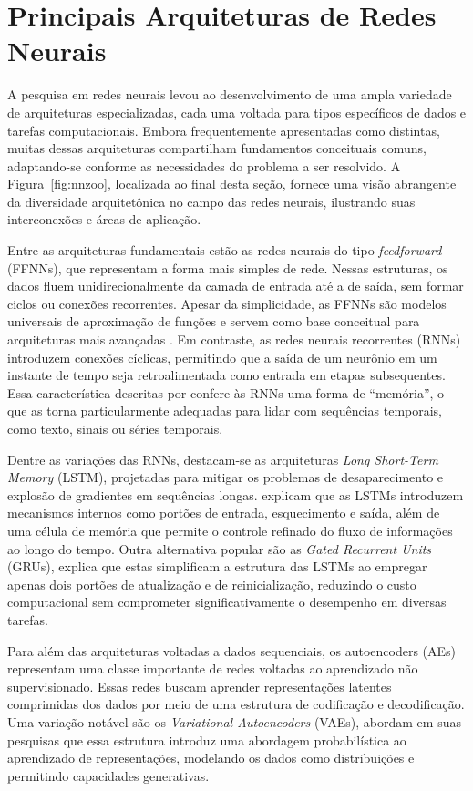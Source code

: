 \section{Principais Arquiteturas de Redes Neurais}

 A pesquisa em redes neurais levou ao desenvolvimento de uma ampla variedade de arquiteturas especializadas, cada uma voltada para tipos específicos de dados e tarefas computacionais. Embora frequentemente apresentadas como distintas, muitas dessas arquiteturas compartilham fundamentos conceituais comuns, adaptando-se conforme as necessidades do problema a ser resolvido. A Figura~\ref{fig:nnzoo}, localizada ao final desta seção,  fornece uma visão abrangente da diversidade arquitetônica no campo das redes neurais, ilustrando suas interconexões e áreas de aplicação.

Entre as arquiteturas fundamentais estão as redes neurais do tipo \textit{feedforward} (FFNNs), que representam a forma mais simples de rede. Nessas estruturas, os dados fluem unidirecionalmente da camada de entrada até a de saída, sem formar ciclos ou conexões recorrentes. Apesar da simplicidade, as FFNNs são modelos universais de aproximação de funções e servem como base conceitual para arquiteturas mais avançadas . Em contraste, as redes neurais recorrentes (RNNs) introduzem conexões cíclicas, permitindo que a saída de um neurônio em um instante de tempo seja retroalimentada como entrada em etapas subsequentes. Essa característica descritas por  confere às RNNs uma forma de “memória”, o que as torna particularmente adequadas para lidar com sequências temporais, como texto, sinais ou séries temporais.

Dentre as variações das RNNs, destacam-se as arquiteturas \textit{Long Short-Term Memory} (LSTM), projetadas para mitigar os problemas de desaparecimento e explosão de gradientes em sequências longas.  explicam que as LSTMs introduzem mecanismos internos como portões de entrada, esquecimento e saída, além de uma célula de memória que permite o controle refinado do fluxo de informações ao longo do tempo. Outra alternativa popular são as \textit{Gated Recurrent Units} (GRUs),  explica que estas simplificam a estrutura das LSTMs ao empregar apenas dois portões de atualização e de reinicialização, reduzindo o custo computacional sem comprometer significativamente o desempenho em diversas tarefas.

Para além das arquiteturas voltadas a dados sequenciais, os autoencoders (AEs) representam uma classe importante de redes voltadas ao aprendizado não supervisionado. Essas redes buscam aprender representações latentes comprimidas dos dados por meio de uma estrutura de codificação e decodificação. Uma variação notável são os \textit{Variational Autoencoders} (VAEs),  abordam em suas pesquisas que essa estrutura introduz uma abordagem probabilística ao aprendizado de representações, modelando os dados como distribuições e permitindo capacidades generativas.

